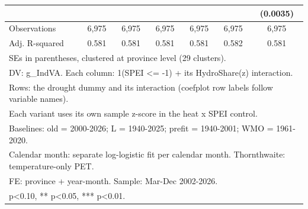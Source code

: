 {\begin{tabular}{l*{6}{c}}
                    &                     &                     &                     &                     &                     &    (0.0035)         \\
\midrule
Observations        &       6,975         &       6,975         &       6,975         &       6,975         &       6,975         &       6,975         \\
Adj. R-squared      &       0.581         &       0.581         &       0.581         &       0.581         &       0.582         &       0.581         \\
\bottomrule
\multicolumn{7}{l}{\footnotesize SEs in parentheses, clustered at province level (29 clusters).}\\
\multicolumn{7}{l}{\footnotesize DV: g\_IndVA. Each column: 1(SPEI <= -1) + its HydroShare(z) interaction.}\\
\multicolumn{7}{l}{\footnotesize Rows: the drought dummy and its interaction (coefplot row labels follow variable names).}\\
\multicolumn{7}{l}{\footnotesize Each variant uses its own sample z-score in the heat x SPEI control.}\\
\multicolumn{7}{l}{\footnotesize Baselines: old = 2000-2026; L = 1940-2025; prefit = 1940-2001; WMO = 1961-2020.}\\
\multicolumn{7}{l}{\footnotesize Calendar month: separate log-logistic fit per calendar month. Thornthwaite: temperature-only PET.}\\
\multicolumn{7}{l}{\footnotesize FE: province + year-month. Sample: Mar-Dec 2002-2026.}\\
\multicolumn{7}{l}{\footnotesize * p<0.10, ** p<0.05, *** p<0.01.}\\
\end{tabular}
}
